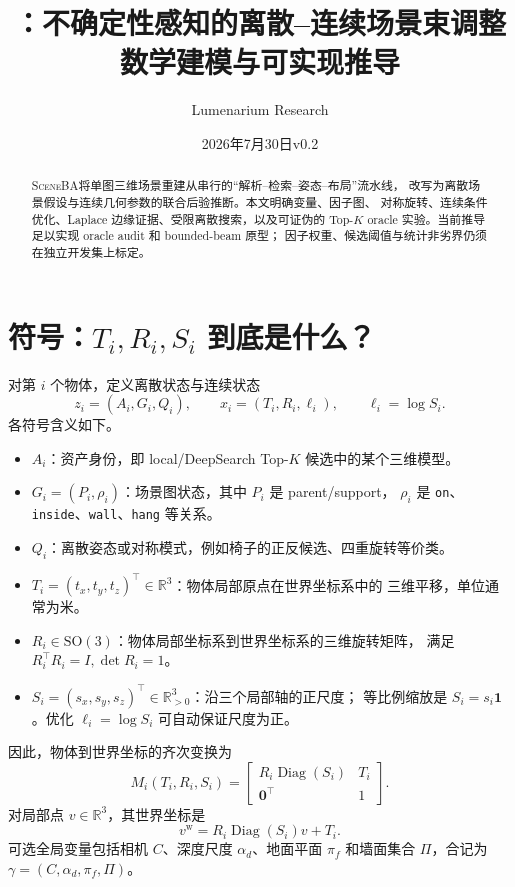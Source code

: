 \documentclass[11pt,a4paper]{ctexart}
\title{\SceneBA：不确定性感知的离散--连续场景束调整\\
\large 数学建模与可实现推导}
\author{Lumenarium Research}
\date{2026年7月30日\quad v0.2}
\newcommand{\SO}{\mathrm{SO}}
\newcommand{\Diag}{\operatorname{Diag}}
\newcommand{\SceneBA}{\textsc{SceneBA}}
\begin{document}
\maketitle
\begin{abstract}
\SceneBA 将单图三维场景重建从串行的``解析--检索--姿态--布局''流水线，
改写为离散场景假设与连续几何参数的联合后验推断。本文明确变量、因子图、
对称旋转、连续条件优化、Laplace 边缘证据、受限离散搜索，以及可证伪的
Top-$K$ oracle 实验。当前推导足以实现 oracle audit 和 bounded-beam 原型；
因子权重、候选阈值与统计非劣界仍须在独立开发集上标定。
\end{abstract}

\section{符号：$T_i,R_i,S_i$ 到底是什么？}
对第 $i$ 个物体，定义离散状态与连续状态
\begin{equation}
 z_i=(A_i,G_i,Q_i),\qquad
 x_i=(T_i,R_i,\ell_i),\qquad \ell_i=\log S_i .
\end{equation}
各符号含义如下。
\begin{itemize}
  \item $A_i$：资产身份，即 local/DeepSearch Top-$K$ 候选中的某个三维模型。
  \item $G_i=(P_i,\rho_i)$：场景图状态，其中 $P_i$ 是 parent/support，
  $\rho_i$ 是 \texttt{on}、\texttt{inside}、\texttt{wall}、\texttt{hang} 等关系。
  \item $Q_i$：离散姿态或对称模式，例如椅子的正反候选、四重旋转等价类。
  \item $T_i=(t_x,t_y,t_z)^\top\in\mathbb R^3$：物体局部原点在世界坐标系中的
  三维平移，单位通常为米。
  \item $R_i\in\SO(3)$：物体局部坐标系到世界坐标系的三维旋转矩阵，
  满足 $R_i^\top R_i=I,\det R_i=1$。
  \item $S_i=(s_x,s_y,s_z)^\top\in\mathbb R_{>0}^3$：沿三个局部轴的正尺度；
  等比例缩放是 $S_i=s_i\bm 1$。优化 $\ell_i=\log S_i$ 可自动保证尺度为正。
\end{itemize}
因此，物体到世界坐标的齐次变换为
\begin{equation}
 M_i(T_i,R_i,S_i)=
 \begin{bmatrix}
 R_i\Diag(S_i)&T_i\\
 \bm 0^\top&1
 \end{bmatrix}.
\end{equation}
对局部点 $v\in\mathbb R^3$，其世界坐标是
\begin{equation}
 v^{\mathrm w}=R_i\Diag(S_i)v+T_i.
\end{equation}
可选全局变量包括相机 $C$、深度尺度 $\alpha_d$、地面平面 $\pi_f$ 和墙面集合
$\Pi$，合记为 $\gamma=(C,\alpha_d,\pi_f,\Pi)$。
\end{document}
